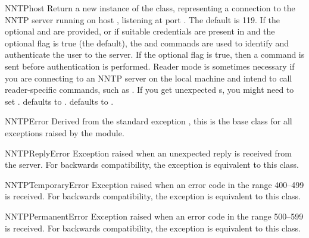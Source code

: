 \begin{classdesc}{NNTP}{host}
Return a new instance of the  class, representing a
connection to the NNTP server running on host , listening at
port .  The default  is 119.  If the optional
 and  are provided, 
or if suitable credentials are present in  and the
optional flag  is true (the default),
the  and  commands are used to
identify and authenticate the user to the server.  If the optional
flag  is true, then a  command is
sent before authentication is performed.  Reader mode is sometimes
necessary if you are connecting to an NNTP server on the local machine
and intend to call reader-specific commands, such as .  If
you get unexpected s, you might need to set
.   defaults to .
 defaults to .

\end{classdesc}

\begin{excdesc}{NNTPError}
Derived from the standard exception , this is the
base class for all exceptions raised by the  module.
\end{excdesc}

\begin{excdesc}{NNTPReplyError}
Exception raised when an unexpected reply is received from the
server.  For backwards compatibility, the exception 
is equivalent to this class.
\end{excdesc}

\begin{excdesc}{NNTPTemporaryError}
Exception raised when an error code in the range 400--499 is
received.  For backwards compatibility, the exception
 is equivalent to this class.
\end{excdesc}

\begin{excdesc}{NNTPPermanentError}
Exception raised when an error code in the range 500--599 is
received.  For backwards compatibility, the exception
 is equivalent to this class.
\end{excdesc}

